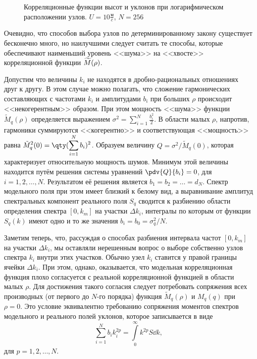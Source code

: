 \begin{figure}[h!]
\begin{minipage}{0.49\linewidth}
			\label{fig:ca1}		
	\end{minipage}
	\caption{Корреляционные функции высот и уклонов при логарифмическом расположении узлов. $U=10 \frac{\text{м}}{c}$, $N=256$}
\end{figure}



Очевидно, что способов выбора узлов по детерминированному закону существует бесконечно много, но наилучшими следует считать те способы, которые обеспечивают наименьший уровень <<шума>> на <<хвосте>> корреляционной функции $\widetilde{M}(\rho)$.


Допустим что величины $k_i$ не находятся в дробно-рациональных отношениях друг к другу. В этом случае можно полагать, что сложение гармонических составляющих с частотами $k_i$ и амплитудами $b_i$ при больших $\rho$ происходит <<некогерентным>> образом. При этом мощность <<шума>> функции $\tilde M_q(\rho)$ определяется выражением 
$\displaystyle \sigma^2= \sum_{i=1}^N \frac{b_i^2}{2}$. В области малых $\rho$, напротив, гармоники суммируются <<когерентно>> и соответствующая <<мощность>> равна 
$\displaystyle \tilde M^2_q(0)=\qty(\sum_{i=1}^N b_i)^2$. Образуем величину 
$Q=\sigma^2/\tilde M_q(0)$, которая характеризует относительную мощность шумов. Минимум этой величины находится путём решения системы уравнений $\pdv{Q}{b_i}=0$, для $i=1,2,\dots,N.$
Результатом её решения является $b_1=b_2=\dots = d_N$. Спектр модельного поля при этом имеет близкий к белому вид, а выравнивание амплитуд спектральных компонент реального поля $S_q$ сводится к разбиению области определения спектра $[0, k_m]$ на участки $\Delta k_i$, интегралы по которым от функции $S_q(k)$ имеют одно и то же значения $b_i=b_0=\sigma^2_q/N$.

Заметим теперь, что, рассуждая о способах разбиения интервала частот $[0, k_m]$ на участки $\Delta k_i$, мы оставляли нерешенным вопрос о выборе собственно узлов спектра $k_i$ внутри этих участков. Обычно узел $k_i$ ставится у правой границы ячейки $\Delta k_i$. При этом, однако, оказывается, что модельная корреляционная функция плохо согласуется с реальной корреляционной функцией в области малых $\rho$. Для достижения такого согласия следует потребовать сопряжения всех производных (от первого до $N$-го порядка) функция $\tilde M_q(\rho)$ и $M_q(q)$ при $\rho=0$. Это условие эквивалентно требованию сопряжения моментов спектров модельного и реального полей уклонов, которое записывается в виде 
\begin{equation}
	\sum_{i=1}^N b_ik_i^{2p}=\int\limits_{0}^{\infty} k^{2p}S\dd{k},
\end{equation}
для $p=1,2,\dots,N.$

